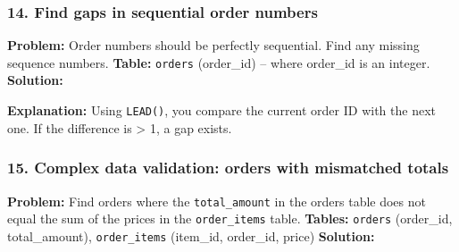 \subsubsection{14. Find gaps in sequential order
numbers}\label{find-gaps-in-sequential-order-numbers}

\textbf{Problem:} Order numbers should be perfectly sequential. Find any
missing sequence numbers. \textbf{Table:} \texttt{orders} (order\_id) --
where order\_id is an integer. \textbf{Solution:}

\begin{Shaded}
\begin{Highlighting}[]
\OperatorTok{+}  
\OperatorTok{{-}}  
\NormalTok{ (}
        \NormalTok{ (} 
\OperatorTok{{-}}\OperatorTok{\textgreater{}} \NormalTok{;}
\end{Highlighting}
\end{Shaded}

\textbf{Explanation:} Using \texttt{LEAD()}, you compare the current
order ID with the next one. If the difference is \textgreater{} 1, a gap
exists.

\subsubsection{15. Complex data validation: orders with mismatched
totals}\label{complex-data-validation-orders-with-mismatched-totals}

\textbf{Problem:} Find orders where the \texttt{total\_amount} in the
orders table does not equal the sum of the prices in the
\texttt{order\_items} table. \textbf{Tables:} \texttt{orders}
(order\_id, total\_amount), \texttt{order\_items} (item\_id, order\_id,
price) \textbf{Solution:}

\begin{Shaded}
\begin{Highlighting}[]
\OperatorTok{=}
 
\OperatorTok{!=} 
\end{Highlighting}
\end{Shaded}

